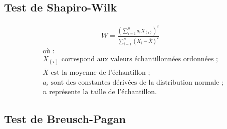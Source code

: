 \subsection{Test de Shapiro-Wilk}
    \label{annexes:methodologie-ols-shapiro-wilk}

    \begin{equation}
    \label{annexes:equation:shapiro-wilk}
    \begin{aligned}
W = \frac{\left( \sum_{i=1}^{n} a_i X_{(i)} \right)^2}{\sum_{i=1}^{n} (X_i - \bar{X})^2}
    \end{aligned}
    \end{equation}
\begin{align*}
    &\text{où~:} \\
    &X_{(i)} \text{ correspond aux valeurs échantillonnées ordonnées~;} \\
    &\bar{X} \text{ est la moyenne de l'échantillon~;} \\
    &a_i \text{ sont des constantes dérivées de la distribution normale~;} \\
    &n \text{ représente la taille de l'échantillon.}
\end{align*}

\subsection{Test de Breusch-Pagan}
    \label{annexes:methodologie-ols-breusch-pagan}

